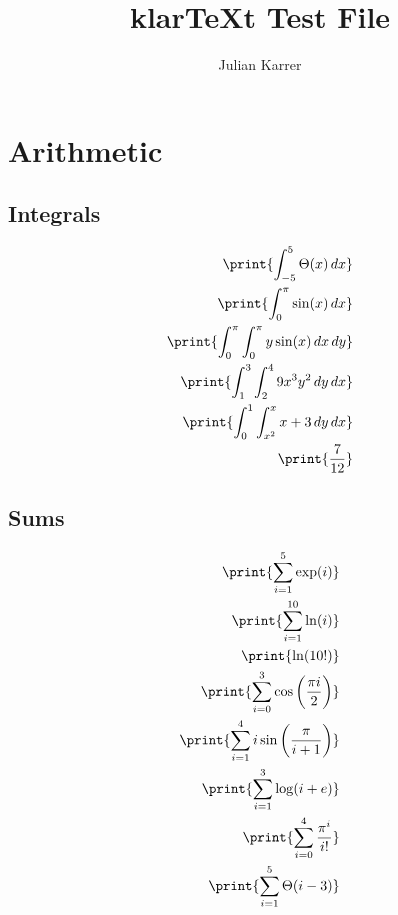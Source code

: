 \documentclass[oneside, a4paper]{article}
\author{Julian Karrer}
\title{klarTeXt Test File}
\begin{document}
\maketitle

\section*{Arithmetic}

\subsection*{Integrals}
\begin{program}
\begin{align*}
    \print{\int_{-5}^5 \Theta(x) \, dx}\\
    \print{\int_0^\pi \sin(x) \, dx}\\
    \print{\int_0^\pi\int_{0}^{\pi} y\sin(x) \, dx\, dy}\\
    \print{\int_1^3\int_2^4 9x^3y^2 \, dy\, dx}\\
    \print{\int_0^1\int_{x^2}^x x+3 \, dy\, dx}\\
    \print{\frac{7}{12}}\\
\end{align*}
\end{program}

\subsection*{Sums}
\begin{program}
\begin{align*}
    \print{\sum_{i=1}^5 \exp(i)}\\
    \print{\sum_{i=1}^{10} \ln(i)}\\
    \print{\ln(10!)}\\
    \print{\sum_{i=0}^{3}\cos\left(\frac{\pi i}{2}\right)}\\
    \print{\sum_{i=1}^{4} i\sin\left(\frac{\pi}{i+1}\right)}\\
    \print{\sum_{i=1}^{3} \log(i+e)}\\
    \print{\sum_{i=0}^{4} \frac{\pi^i}{i!}}\\
    \print{\sum_{i=1}^{5} \Theta(i-3)}\\
\end{align*}
\end{program}
\end{document}

